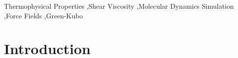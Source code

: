 \documentclass[preprint,review,12pt]{elsarticle}
\begin{document}
\begin{frontmatter}
\begin{abstract}
			
			
			
		\end{abstract}
		
		\begin{keyword}
			
			
			
			Thermophysical Properties \sep Shear Viscosity \sep Molecular Dynamics Simulation \sep Force Fields \sep Green-Kubo
			
		\end{keyword}
		
	\end{frontmatter}	
	
%	
%	
%	
%	
%	
	
	\section{Introduction}
	
\end{document}
